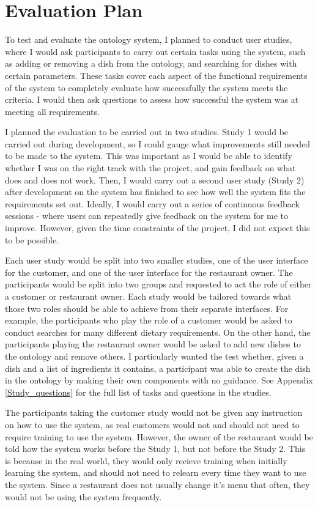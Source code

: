 \section{Evaluation Plan}

To test and evaluate the ontology system, I planned to conduct user studies, where I would ask participants to carry out certain tasks using the system, such as adding or removing a dish from the ontology, and searching for dishes with certain parameters. These tasks cover each aspect of the functional requirements of the system to completely evaluate how successfully the system meets the criteria. I would then ask questions to assess how successful the system was at meeting all requirements.

I planned the evaluation to be carried out in two studies. Study 1 would be carried out during development, so I could gauge what improvements still needed to be made to the system. This was important as I would be able to identify whether I was on the right track with the project, and gain feedback on what does and does not work. Then, I would carry out a second user study (Study 2) after development on the system has finished to see how well the system fits the requirements set out. Ideally, I would carry out a series of continuous feedback sessions - where users can repeatedly give feedback on the system for me to improve. However, given the time constraints of the project, I did not expect this to be possible.

Each user study would be split into two smaller studies, one of the user interface for the customer, and one of the user interface for the restaurant owner. The participants would be split into two groups and requested to act the role of either a customer or restaurant owner. Each study would be tailored towards what those two roles should be able to achieve from their separate interfaces. For example, the participants who play the role of a customer would be asked to conduct searches for many different dietary requirements. On the other hand, the participants playing the restaurant owner would be asked to add new dishes to the ontology and remove others. I particularly wanted the test whether, given a dish and a list of ingredients it contains, a participant was able to create the dish in the ontology by making their own components with no guidance. See Appendix \ref{Study_questions} for the full list of tasks and questions in the studies.

The participants taking the customer study would not be given any instruction on how to use the system, as real customers would not and should not need to require training to use the system. However, the owner of the restaurant would be told how the system works before the Study 1, but not before the Study 2. This is because in the real world, they would only recieve training when initially learning the system, and should not need to relearn every time they want to use the system. Since a restaurant does not usually change it's menu that often, they would not be using the system frequently.

